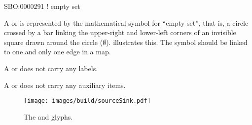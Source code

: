 \begin{glyphDescription}

\glyphSboTerm SBO:0000291 ! empty set

\glyphContainer A  or  is represented by the mathematical symbol for ``empty
set'', that is, a circle crossed by a bar linking the upper-right and
lower-left corners of an invisible square drawn around the circle ($\emptyset$).
 illustrates this.  The symbol should be linked to one
and only one edge in a map.

\glyphLabel A  or  does not carry any labels.

\glyphAux A  or  does not carry any auxiliary items.  

\end{glyphDescription}

\begin{figure}[H]
  \centering
  \texttt{[image: images/build/sourceSink.pdf]}
  \caption{The  and  glyphs.}
  \label{fig:sourceSink}
\end{figure}






